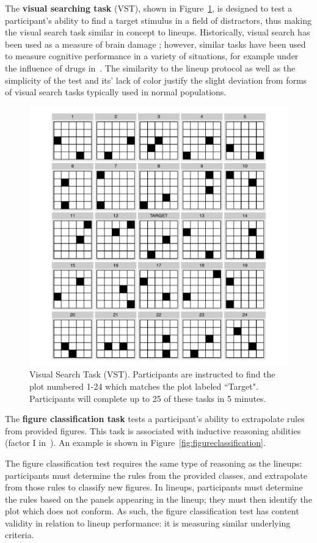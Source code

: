 \documentclass[11pt]{isuthesis}\usepackage[]{graphicx}\usepackage[]{color}
\begin{document}
The \textbf{visual searching task} (VST), shown in Figure~\ref{fig:VST}, is designed to test a participant's ability to find a target stimulus in a field of distractors, thus making the visual search task similar in concept to lineups. Historically, visual search has been used as a measure of brain damage \citep{goldstein1973validity,demita1981validity,moerland1986neuropsychological}; however, similar tasks have been used to measure cognitive performance in a variety of situations, for example under the influence of drugs in~\citep{anderson1983interactive}. The similarity to the lineup protocol as well as the simplicity of the test and its' lack of color justify the slight deviation from forms of visual search tasks typically used in normal populations. 
\begin{figure}[htp]\centering
\includegraphics[width=.6\linewidth]{VisualSearch}
\caption[Visual Search Task]{Visual Search Task (VST). Participants are instructed to find the plot numbered 1-24 which matches the plot labeled ``Target". Participants will complete up to 25 of these tasks in 5 minutes.}\label{fig:VST}
\end{figure}


The \textbf{figure classification task} tests a participant's ability to extrapolate rules from provided figures. This task is associated with inductive reasoning abilities (factor I  in~\citet{ekstrom1976manual}). An example is shown in Figure~\ref{fig:figureclassification}. 

The figure classification test requires the same type of reasoning as the lineups: participants must determine the rules from the provided classes, and extrapolate from those rules to classify new figures. In lineups, participants must determine the rules based on the panels appearing in the lineup; they must then identify the plot which does not conform. As such, the figure classification test has content validity in relation to lineup performance: it is measuring similar underlying criteria. 
\end{document}
